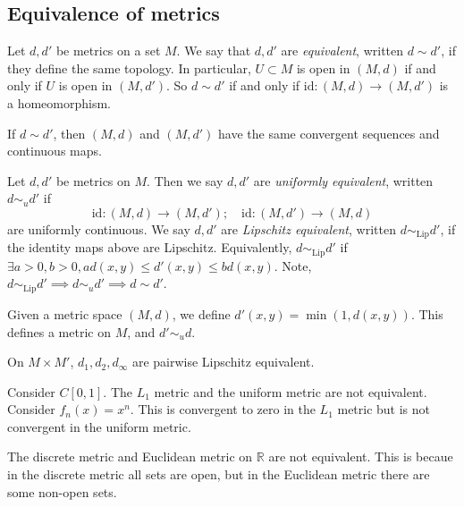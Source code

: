 \subsection{Equivalence of metrics}
\begin{definition}
	Let \( d, d' \) be metrics on a set \( M \).
	We say that \( d, d' \) are \textit{equivalent}, written \( d \sim d' \), if they define the same topology.
	In particular, \( U \subset M \) is open in \( (M,d) \) if and only if \( U \) is open in \( (M,d') \).
	So \( d \sim d' \) if and only if \( \mathrm{id} \colon (M,d) \to (M,d') \) is a homeomorphism.
\end{definition}
\begin{remark}
	If \( d \sim d' \), then \( (M,d) \) and \( (M, d') \) have the same convergent sequences and continuous maps.
\end{remark}
\begin{definition}
	Let \( d, d' \) be metrics on \( M \).
	Then we say \( d, d' \) are \textit{uniformly equivalent}, written \( d \sim_u d' \) if
	\[
		\mathrm{id} \colon (M, d) \to (M, d');\quad \mathrm{id} \colon (M, d') \to (M, d)
	\]
	are uniformly continuous.
	We say \( d, d' \) are \textit{Lipschitz equivalent}, written \( d \sim_\mathrm{Lip} d' \), if the identity maps above are Lipschitz.
	Equivalently, \( d \sim_\mathrm{Lip} d' \) if \( \exists a > 0, b > 0, ad(x,y) \leq d'(x,y) \leq bd(x,y) \).
	Note, \( d \sim_\mathrm{Lip} d' \implies d \sim_u d' \implies d \sim d' \).
\end{definition}
\begin{example}
	Given a metric space \( (M,d) \), we define \( d'(x,y) = \min(1,d(x,y)) \).
	This defines a metric on \( M \), and \( d' \sim_u d \).
\end{example}
\begin{example}
	On \( M \times M' \), \( d_1, d_2, d_\infty \) are pairwise Lipschitz equivalent.
\end{example}
\begin{example}
	Consider \( C[0,1] \).
	The \( L_1 \) metric and the uniform metric are not equivalent.
	Consider \( f_n(x) = x^n \).
	This is convergent to zero in the \( L_1 \) metric but is not convergent in the uniform metric.
\end{example}
\begin{example}
	The discrete metric and Euclidean metric on \( \mathbb R \) are not equivalent.
	This is becaue in the discrete metric all sets are open, but in the Euclidean metric there are some non-open sets.
\end{example}

